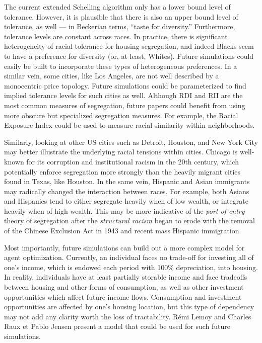 \documentclass[11pt]{asaproc}
\newcommand{\1}{\mathbb{1}}
\begin{document}
The current extended Schelling algorithm only has a lower bound level of tolerance. However, it is plausible that there is also an upper bound level of tolerance, as well --- in Beckerian terms, ``taste for diversity.'' Furthermore, tolerance levels are constant across races. In practice, there is significant heterogeneity of racial tolerance for housing segregation, and indeed Blacks seem to have a preference for diversity (or, at least, Whites). Future simulations could easily be built to incorporate these types of heterogeneous preferences. In a similar vein, some cities, like Los Angeles, are not well described by a monocentric price topology. Future simulations could be parameterized to find implied tolerance levels for such cities as well. Although RDI and RII are the most common measures of segregation, future papers could benefit from using more obscure but specialized segregation measures. For example, the Racial Exposure Index could be used to measure racial similarity within neighborhoods.

Similarly, looking at other US cities such as Detroit, Houston, and New York City may better illustrate the underlying racial tensions within cities. Chicago is well-known for its corruption and institutional racism in the 20th century, which potentially enforce segregation more strongly than the heavily migrant cities found in Texas, like Houston. In the same vein, Hispanic and Asian immigrants may radically changed the interaction between races. For example, both Asians and Hispanics tend to either segregate heavily when of low wealth, or integrate heavily when of high wealth. This may be more indicative of the \textit{port of entry} theory of segregation after the \textit{structural racism} began to erode with the removal of the Chinese Exclusion Act in 1943 and recent mass Hispanic immigration.

Most importantly, future simulations can build out a more complex model for agent optimization. Currently, an individual faces no trade-off for investing all of one's income, which is endowed each period with 100\% depreciation, into housing. In reality, individuals have at least partially storable income and face tradeoffs between housing and other forms of consumption, as well as other investment opportunities which affect future income flows. Consumption and investment opportunities are affected by one's housing location, but this type of dependency may not add any clarity worth the loss of tractability. R\'emi Lemoy and Charles Raux et Pablo Jensen present a model that could be used for such future simulations\citep{lemoy10}.  
\end{document}
